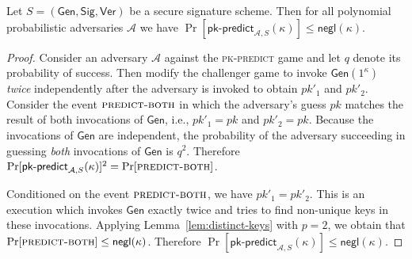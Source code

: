 \begin{lemma}\label{lem:pk-unpredictability}
  Let $S = (\textsf{Gen}, \textsf{Sig}, \textsf{Ver})$ be a secure signature scheme. Then for all polynomial probabilistic adversaries $\mathcal{A}$ we have $\Pr[\textsf{pk-predict}_{\mathcal{A},S}(\kappa)] \leq \textsf{negl}(\kappa)$.
\end{lemma}
\begin{proof}
  Consider an adversary $\mathcal{A}$ against the \textsc{pk-predict} game and let $q$ denote its probability of success. Then modify the challenger game to invoke $\textsf{Gen}(1^\kappa)$ \emph{twice} independently after the adversary is invoked to obtain $pk'_1$ and $pk'_2$. Consider the event $\textsc{predict-both}$ in which the adversary's guess $pk$ matches the result of both invocations of $\textsf{Gen}$, i.e., $pk'_1 = pk$ and $pk'_2 = pk$.
  Because the invocations of $\textsf{Gen}$ are independent, the probability of the adversary succeeding in guessing \emph{both} invocations of $\textsf{Gen}$ is $q^2$. Therefore
  $
  \Pr[\textsf{pk-predict}_{\mathcal{A},S}(\kappa)]^2 = \Pr[\textsc{predict-both}]
  $.

  Conditioned on the event $\textsc{predict-both}$, we have $pk'_1 = pk'_2$. This is an execution which invokes $\textsf{Gen}$ exactly twice and tries to find non-unique keys in these invocations. Applying Lemma~\ref{lem:distinct-keys} with $p = 2$, we obtain that
  $
  \Pr[\textsc{predict-both}] \leq \textsf{negl}(\kappa)
  $.
  Therefore
  $
  \Pr[\textsf{pk-predict}_{\mathcal{A},S}(\kappa)] \leq \textsf{negl}(\kappa)
  $.
\end{proof}

